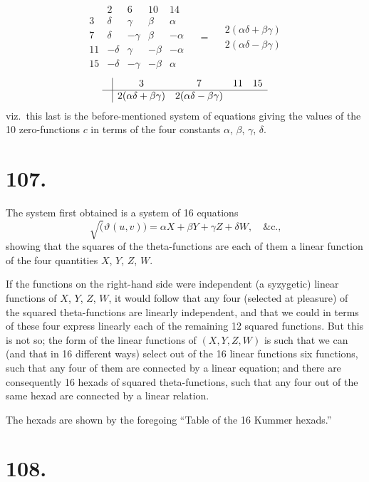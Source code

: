 \documentclass[11pt,a4paper]{article}
\newcommand{\uth}[1]{\vartheta_{#1}}
\begin{document}
\[
\begin{array}{c|cccc}
& 2 & 6 & 10 & 14 \\
\hline
3 & \delta & \gamma & \beta & \alpha \\
7 & \delta & -\gamma & \beta & -\alpha \\
11 & -\delta & \gamma & -\beta & -\alpha \\
15 & -\delta & -\gamma & -\beta & \alpha
\end{array}
\quad = \quad
\begin{array}{l}
2(\alpha\delta + \beta\gamma) \\
2(\alpha\delta - \beta\gamma)
\end{array}
\]
\[
\begin{array}{c|cccc}
& 3 & 7 & 11 & 15 \\
\hline
& 2(\alpha\delta + \beta\gamma) & 2(\alpha\delta - \beta\gamma)
\end{array}
\]
viz.\ this last is the before-mentioned system of equations giving the values of the 10 zero-functions $c$ in terms of the four constants $\alpha$, $\beta$, $\gamma$, $\delta$.

\newpage
\section*{107.}
\label{sec:107}

The system first obtained is a system of 16 equations
\[
\surd(\uth{}(u,v)) = \alpha X + \beta Y + \gamma Z + \delta W, \quad \text{\&c.,}
\]
showing that the squares of the theta-functions are each of them a linear function of the four quantities $X$, $Y$, $Z$, $W$.

If the functions on the right-hand side were independent (a syzygetic) linear functions of $X$, $Y$, $Z$, $W$, it would follow that any four (selected at pleasure) of the squared theta-functions are linearly independent, and that we could in terms of these four express linearly each of the remaining 12 squared functions. But this is not so; the form of the linear functions of $(X, Y, Z, W)$ is such that we can (and that in 16 different ways) select out of the 16 linear functions six functions, such that any four of them are connected by a linear equation; and there are consequently 16 hexads of squared theta-functions, such that any four out of the same hexad are connected by a linear relation.

The hexads are shown by the foregoing ``Table of the 16 Kummer hexads.''

\newpage
\section*{108.}
\label{sec:108}
\end{document}
